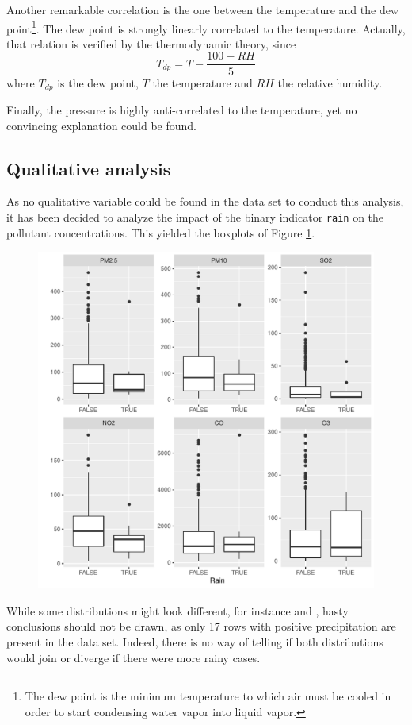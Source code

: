 \documentclass[a4paper, 12pt]{article}
\begin{document}
	Another remarkable correlation is the one between the temperature and the dew point\footnote{The dew point is the minimum temperature to which air must be cooled in order to start condensing water vapor into liquid vapor.}. The dew point is strongly linearly correlated to the temperature. Actually, that relation is verified by the thermodynamic theory, since
	\begin{equation}\label{eq:dewp}
	    T_{dp} = T - \frac{100 - RH}{5}
	\end{equation}
	where $T_{dp}$ is the dew point, $T$ the temperature and $RH$ the relative humidity. \par
	Finally, the pressure is highly anti-correlated to the temperature, yet no convincing explanation could be found.
	\vspace{3em}
	\subsection{Qualitative analysis}
	As no qualitative variable could be found in the data set to conduct this analysis, it has been decided to analyze the impact of the binary indicator \texttt{rain} on the pollutant concentrations. This yielded the boxplots of Figure \ref{fig:pollutants_rain}. \par
	\begin{figure}[h]
	    \centering
	    \includegraphics[height=0.6\textwidth]{resources/pdf/pollutants_rain.pdf}
	    \label{fig:pollutants_rain}
	\end{figure}
	While some distributions might look different, for instance  and , hasty conclusions should not be drawn, as only \num{17} rows with positive precipitation are present in the data set. Indeed, there is no way of telling if both distributions would join or diverge if there were more rainy cases. \par
\end{document}

